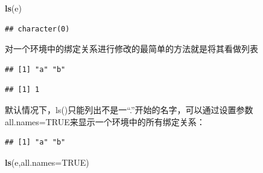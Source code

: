 \documentclass[]{book}
\newenvironment{Shaded}{\begin{snugshade}}{\end{snugshade}}
\newcommand{\KeywordTok}[1]{\textcolor[rgb]{0.13,0.29,0.53}{\textbf{#1}}}
\newcommand{\DataTypeTok}[1]{\textcolor[rgb]{0.13,0.29,0.53}{#1}}
\newcommand{\DecValTok}[1]{\textcolor[rgb]{0.00,0.00,0.81}{#1}}
\newcommand{\StringTok}[1]{\textcolor[rgb]{0.31,0.60,0.02}{#1}}
\newcommand{\OtherTok}[1]{\textcolor[rgb]{0.56,0.35,0.01}{#1}}
\newcommand{\OperatorTok}[1]{\textcolor[rgb]{0.81,0.36,0.00}{\textbf{#1}}}
\newcommand{\NormalTok}[1]{#1}
\begin{document}
\begin{Shaded}
\begin{Highlighting}[]
\KeywordTok{ls}\NormalTok{(e)}
\end{Highlighting}
\end{Shaded}

\begin{verbatim}
## character(0)
\end{verbatim}

对一个环境中的绑定关系进行修改的最简单的方法就是将其看做列表

\begin{Shaded}
\end{Shaded}

\begin{verbatim}
## [1] "a" "b"
\end{verbatim}

\begin{Shaded}
\end{Shaded}

\begin{verbatim}
## [1] 1
\end{verbatim}

默认情况下，ls()只能列出不是一``.''开始的名字，可以通过设置参数all.names=TRUE来显示一个环境中的所有绑定关系：

\begin{Shaded}
\end{Shaded}

\begin{verbatim}
## [1] "a" "b"
\end{verbatim}

\begin{Shaded}
\begin{Highlighting}[]
\KeywordTok{ls}\NormalTok{(e,}\DataTypeTok{all.names=}\OtherTok{TRUE}\NormalTok{)}
\end{Highlighting}
\end{Shaded}
\end{document}
